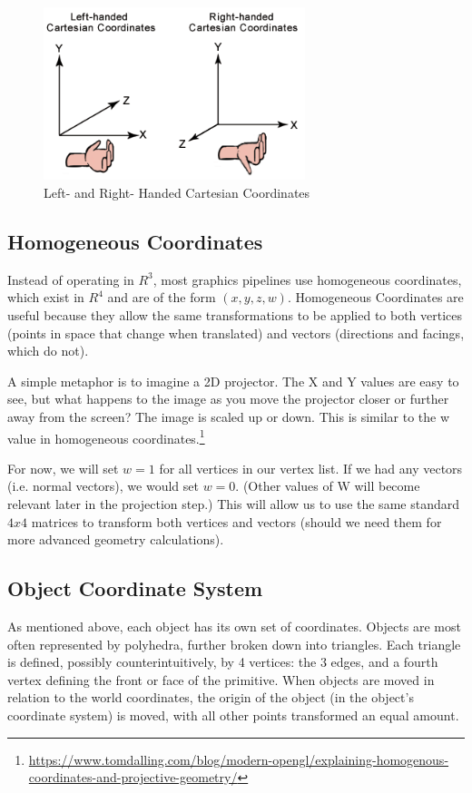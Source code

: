 \documentclass{article}
\begin{document}
\begin{figure}[H]
    \centering
    \includegraphics[width=3.0in]{leftrght.png}
    \caption{Left- and Right- Handed Cartesian Coordinates}
    \label{LeftRight}
\end{figure}

\subsection{Homogeneous Coordinates}
Instead of operating in $R^3$, most graphics pipelines use homogeneous coordinates, which exist in $R^4$ and are of the form $(x, y, z, w)$. Homogeneous Coordinates are useful because they allow the same transformations to be applied to both vertices (points in space that change when translated) and vectors (directions and facings, which do not).

A simple metaphor is to imagine a 2D projector. The X and Y values are easy to see, but what happens to the image as you move the projector closer or further away from the screen? The image is scaled up or down. This is similar to the w value in homogeneous coordinates.\footnote{\url{https://www.tomdalling.com/blog/modern-opengl/explaining-homogenous-coordinates-and-projective-geometry/}} 

For now, we will set $w = 1$ for all vertices in our vertex list. If we had any vectors (i.e. normal vectors), we would set $w = 0$. (Other values of W will become relevant later in the projection step.) This will allow us to use the same standard $4x4$ matrices to transform both vertices and vectors (should we need them for more advanced geometry calculations).

\subsection{Object Coordinate System}
As mentioned above, each object has its own set of coordinates. Objects are most often represented by polyhedra, further broken down into triangles. Each triangle is defined, possibly counterintuitively, by 4 vertices: the 3 edges, and a fourth vertex defining the front or face of the primitive. When objects are moved in relation to the world coordinates, the origin of the object (in the object's coordinate system) is moved, with all other points transformed an equal amount.
\end{document}

